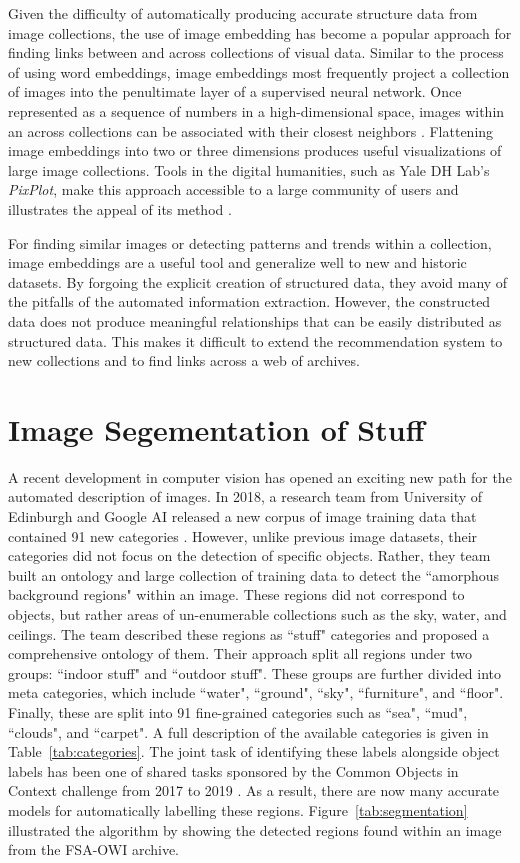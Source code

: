 \documentclass[10pt, a4paper]{article}
\begin{document}
Given the difficulty of automatically producing accurate structure data from
image collections, the use of image embedding has become a popular approach
for finding links between and across collections of visual data. Similar to
the process of using word embeddings, image embeddings most frequently project
a collection of images into the penultimate layer of a supervised neural
network. Once represented as a sequence of numbers in a high-dimensional space,
images within an across collections can be associated with their closest
neighbors \cite{mcauley2015image}. Flattening image embeddings into two or three dimensions
produces useful visualizations of large image collections. Tools in the digital
humanities, such as Yale DH Lab's \textit{PixPlot}, make this approach
accessible to a large community of users and illustrates the appeal of its
method \cite{pixplot}.

For finding similar images or detecting patterns and trends within a collection,
image embeddings are a useful tool and generalize well to new and historic datasets.
By forgoing the explicit creation of structured data, they avoid many of the
pitfalls of the automated information extraction. However, the constructed data
does not produce meaningful relationships that can be easily distributed as
structured data. This makes it difficult to extend the recommendation system
to new collections and to find links across a web of archives.


\section{Image Segementation of Stuff} \label{sec:imageseg}

A recent development in computer vision has opened an exciting new path for the
automated description of images. In 2018, a research team from
University of Edinburgh and Google AI released a new corpus of image training
data that contained 91 new categories \cite{caesar2018coco}. However, unlike
previous image datasets, their categories did not focus on the detection of
specific objects. Rather, they team built an ontology and large collection of
training data to detect the ``amorphous background regions" within an image.
These regions did not correspond to objects, but rather areas of un-enumerable
collections such as the sky, water, and ceilings. The team described these
regions as ``stuff" categories and proposed a comprehensive ontology of them.
Their approach split all regions under two groups: ``indoor stuff" and
``outdoor stuff". These groups are further divided into meta categories,
which include ``water", ``ground", ``sky", ``furniture", and ``floor". Finally,
these are split into 91 fine-grained
categories such as ``sea", ``mud", ``clouds", and ``carpet". A full description
of the available categories is given in Table~\ref{tab:categories}.
The joint task of identifying these labels alongside object labels
has been one of shared tasks sponsored by the Common Objects in Context
challenge from 2017 to 2019 \cite{kirillov2019panoptic}.
As a result, there are now many accurate models for automatically labelling
these regions. Figure~\ref{tab:segmentation} illustrated the algorithm by showing
the detected regions found within an image from the FSA-OWI archive.
\end{document}

